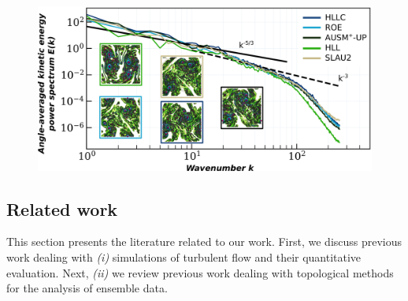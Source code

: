 \begin{figure}
 \centering
 \includegraphics[width=\linewidth]{chapter4_topology_data_analysis/pictures/energie.jpg}
 \label{energie}
\end{figure}

\subsection{Related work}
\label{sec_relatedWork}
This section presents the literature related to our work.
First, we
 discuss previous work dealing with \emph{(i)} simulations of turbulent
flow
and their quantitative evaluation. Next, \emph{(ii)} we review
previous work dealing with topological methods for the analysis of ensemble
data.

